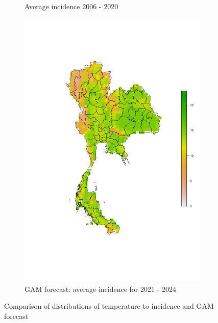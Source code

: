 \documentclass[parskip]{scrartcl}
\begin{document}
\begin{figure}
\begin{subfigure}{0.6\textwidth}
			\caption{Average incidence 2006 - 2020}
			\label{fig:av_inc_map}
		\end{subfigure}
			\begin{subfigure}{0.4\textwidth}
		\includegraphics[width=\textwidth]{fig/GAM_map.png}
			\caption{GAM forecast: average incidence for 2021 - 2024}
			\label{fig:GAM_map}
		\end{subfigure}
		
		\caption{Comparison of distributions of temperature to incidence and GAM forecast}
		\label{fig:maps}
		
	\end{figure}
	
\end{document}
